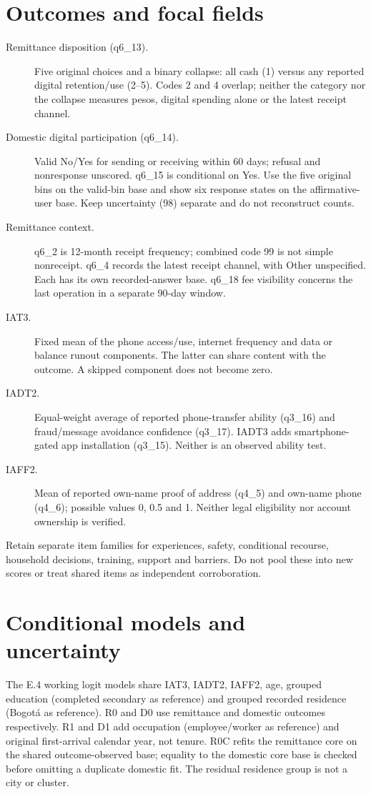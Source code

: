 \section{Outcomes and focal fields}
\begin{description}
\item[Remittance disposition (q6\_13).] Five original choices and a binary collapse: all cash (1) versus any reported digital retention/use (2--5). Codes 2 and 4 overlap; neither the category nor the collapse measures pesos, digital spending alone or the latest receipt channel.
\item[Domestic digital participation (q6\_14).] Valid No/Yes for sending or receiving within 60 days; refusal and nonresponse unscored. q6\_15 is conditional on Yes. Use the five original bins on the valid-bin base and show six response states on the affirmative-user base. Keep uncertainty (98) separate and do not reconstruct counts.
\item[Remittance context.] q6\_2 is 12-month receipt frequency; combined code 99 is not simple nonreceipt. q6\_4 records the latest receipt channel, with Other unspecified. Each has its own recorded-answer base. q6\_18 fee visibility concerns the last operation in a separate 90-day window.
\item[IAT3.] Fixed mean of the phone access/use, internet frequency and data or balance runout components. The latter can share content with the outcome. A skipped component does not become zero.
\item[IADT2.] Equal-weight average of reported phone-transfer ability (q3\_16) and fraud/message avoidance confidence (q3\_17). IADT3 adds smartphone-gated app installation (q3\_15). Neither is an observed ability test.
\item[IAFF2.] Mean of reported own-name proof of address (q4\_5) and own-name phone (q4\_6); possible values 0, 0.5 and 1. Neither legal eligibility nor account ownership is verified.
\end{description}
Retain separate item families for experiences, safety, conditional recourse, household decisions, training, support and barriers. Do not pool these into new scores or treat shared items as independent corroboration.

\section{Conditional models and uncertainty}
The E.4 working logit models share IAT3, IADT2, IAFF2, age, grouped education (completed secondary as reference) and grouped recorded residence (Bogotá as reference). R0 and D0 use remittance and domestic outcomes respectively. R1 and D1 add occupation (employee/worker as reference) and original first-arrival calendar year, not tenure. R0C refits the remittance core on the shared outcome-observed base; equality to the domestic core base is checked before omitting a duplicate domestic fit. The residual residence group is not a city or cluster.

